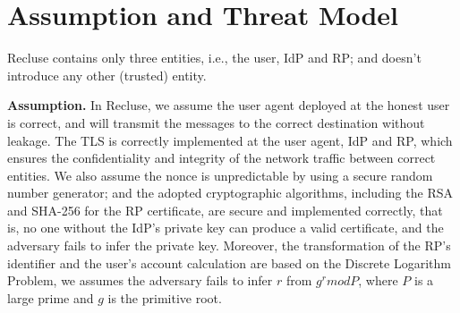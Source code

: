 \section{Assumption and Threat Model}
\label{sec:assumptionandthreatmodel}
Recluse contains only three entities, i.e., the user, IdP and RP; and doesn't introduce any other (trusted) entity.

\begin{comment}
In addition to the conventional processes (described in Section~\ref{subsec:OIDC}) as in the typical SSO systems~\cite{SAMLIdentifier,OpenIDConnect}, extra processes are required on the entities in Recluse to include the solutions provided in section~\ref{subsec:solutions}:
\begin{itemize}
  \item IdP. In the initial registration of RP,  IdP checks the correctness of RP's URL,  assigns an unique original identifier, and generates the RP certificate with its private key. For each identity proof request, IdP calculates the PPID based on the provided RP's transformation identifier.
  \item User. The user verifies the received RP certificate, generates a nonce to participate in the generation of RP's transformation identifier with the RP's original identifier extracted from the certificate, sends the transformation to the IdP, and relays the identity proof to the URL extracted from the RP certificate.
  \item RP. The RP applies the RP certificate from the IdP with correct URL, provides it to the user on each login request, generates a nonce to participate in the generation of RP's transformation identifier, calculates the trapdoor of the transformation, and uses it to derive the user's unique account.
\end{itemize}
\end{comment}

\noindent\textbf{Assumption.} In Recluse, we assume the user agent deployed at the honest user is correct, and will transmit the messages to the correct destination without leakage. The TLS is correctly implemented at the user agent, IdP and RP, which ensures the confidentiality and integrity of the network traffic between correct entities. We also assume the nonce is unpredictable by using  a secure random number generator; and the adopted cryptographic algorithms, including the RSA and SHA-256 for the RP certificate, are secure and implemented correctly, that is, no one without the IdP's private key can produce a valid certificate, and the adversary fails to infer the private key. Moreover, the transformation of the RP's identifier and the user's account calculation are based on the Discrete Logarithm Problem, we assumes the adversary fails to infer $r$ from $g^r mod P$, where $P$ is a large prime and $g$ is the primitive root.

